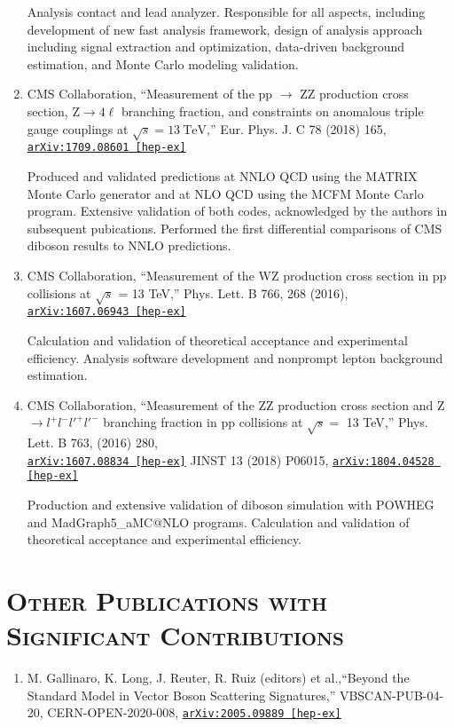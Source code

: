 \documentclass[10pt]{res} %
\begin{document}
\begin{resume}
\begin{enumerate}
    Analysis contact and lead analyzer. Responsible for all aspects, 
    including development of new fast analysis framework, design of analysis approach including signal extraction and optimization,
    data-driven background estimation, and Monte Carlo modeling validation. 
  \item CMS Collaboration, ``Measurement of the pp $\rightarrow$ ZZ production cross section, $\mathrm{Z} \to 4\ell$ branching fraction, and constraints on anomalous triple gauge couplings at $\sqrt{s} = 13~\mathrm{TeV}$,'' Eur. Phys. J. C 78 (2018) 165, \href{https://arxiv.org/abs/1709.08601}{\texttt{arXiv:1709.08601 [hep-ex]}}

    Produced and validated predictions at NNLO QCD using the MATRIX Monte Carlo generator and at NLO QCD using the MCFM Monte Carlo program.
    Extensive validation of both codes, acknowledged by the authors in subsequent pubications.
    Performed the first differential comparisons of CMS diboson results to NNLO predictions.
  \item CMS Collaboration, ``Measurement of the WZ production cross section in pp collisions at $\sqrt{s}$ = 13 TeV,''
Phys. Lett. B 766, 268 (2016), \href{https://arxiv.org/abs/1607.06943}{\texttt{arXiv:1607.06943 [hep-ex]}}

    Calculation and validation of theoretical acceptance and experimental efficiency. 
    Analysis software development and nonprompt lepton background estimation.
  \item CMS Collaboration, ``Measurement of the ZZ production cross section and Z $\rightarrow l^{+}l^{-}l'^{+}l'^{-}$ branching fraction in pp collisions at $\sqrt{s} =$ 13 TeV,''
Phys. Lett. B 763, (2016) 280, \\ \href{https://arxiv.org/abs/1607.08834} {\texttt{arXiv:1607.08834 [hep-ex]}}
JINST 13 (2018) P06015, \href{https://arxiv.org/abs/1804.04528} {\texttt{arXiv:1804.04528 [hep-ex]}}

    Production and extensive validation of diboson simulation with POWHEG and MadGraph5\_aMC@NLO programs. 
    Calculation and validation of theoretical acceptance and experimental efficiency. 
\end{enumerate}

\section{\textsc{Other Publications with Significant Contributions}}
\begin{enumerate}
  \item M. Gallinaro, K. Long, J. Reuter, R. Ruiz (editors) et al.,``Beyond the Standard Model in Vector Boson Scattering Signatures,''
    VBSCAN-PUB-04-20, CERN-OPEN-2020-008, \href{https://arxiv.org/abs/2005.09889}{\texttt{arXiv:2005.09889 [hep-ex]}}


\end{enumerate}
\end{resume}
\end{document}
